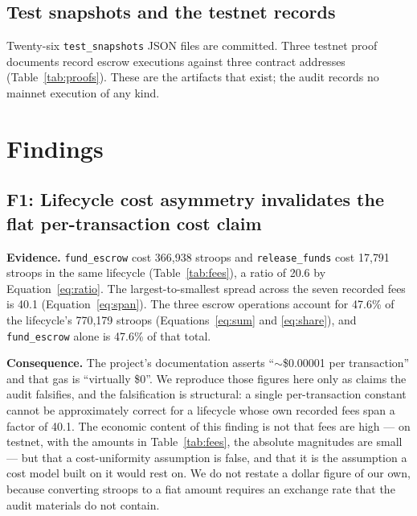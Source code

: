 \documentclass[sigconf,review]{acmart}
\begin{document}

\subsection{Test snapshots and the testnet records}

Twenty-six \texttt{test\_snapshots} JSON files are committed. Three testnet
proof documents record escrow executions against three contract addresses
(Table~\ref{tab:proofs}). These are the artifacts that exist; the audit
records no mainnet execution of any kind.

\section{Findings}
\label{sec:findings}

\subsection{F1: Lifecycle cost asymmetry invalidates the flat per-transaction
cost claim}
\label{f:cost}

\textbf{Evidence.} \texttt{fund\_escrow} cost 366{,}938 stroops and
\texttt{release\_funds} cost 17{,}791 stroops in the same lifecycle
(Table~\ref{tab:fees}), a ratio of 20.6 by Equation~\ref{eq:ratio}. The
largest-to-smallest spread across the seven recorded fees is 40.1
(Equation~\ref{eq:span}). The three escrow operations account for 47.6\% of
the lifecycle's 770{,}179 stroops (Equations~\ref{eq:sum} and
\ref{eq:share}), and \texttt{fund\_escrow} alone is 47.6\% of that total.

\textbf{Consequence.} The project's documentation asserts ``$\sim$\$0.00001 per
transaction'' and that gas is ``virtually \$0''. We reproduce those figures
here only as claims the audit falsifies, and the falsification is structural:
a single per-transaction constant cannot be approximately correct for a
lifecycle whose own recorded fees span a factor of 40.1. The economic content
of this finding is not that fees are high --- on testnet, with the amounts in
Table~\ref{tab:fees}, the absolute magnitudes are small --- but that a
cost-uniformity assumption is false, and that it is the assumption a cost model
built on it would rest on. We do not restate a dollar figure of our own,
because converting stroops to a fiat amount requires an exchange rate that the
audit materials do not contain.
\end{document}
